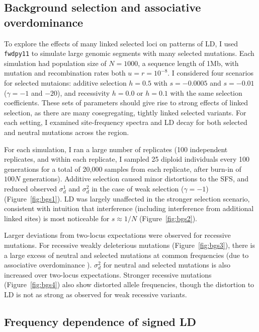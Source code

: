 \documentclass[]{article}
\begin{document}
\subsection{Background selection and associative overdominance}\label{sec:bgs}

To explore the effects of many linked selected loci on patterns of LD, I used
\texttt{fwdpy11} \citep{Thornton2014-pn,Thornton2019-qc} to simulate large
genomic segments with many selected mutations. Each simulation had population
size of \(N=1000\), a sequence length of 1Mb, with mutation and recombination
rates both \(u=r=10^{-8}\). I considered four scenarios for selected mutaions:
additive selection \(h=0.5\) with \(s=-0.0005\) and \(s=-0.01\) (\(\gamma=-1\)
and \(-20\)), and recessivity \(h=0.0\) or \(h=0.1\) with the same selection
coefficients. These sets of parameters should give rise to strong effects of
linked selection, as there are many cosegregating, tightly linked selected
variants. For each setting, I examined site-frequency spectra and LD decay for
both selected and neutral mutations across the region.

For each simulation, I ran a large number of replicates (100 independent
replicates, and within each replicate, I sampled 25 diploid individuals every
100 generations for a total of 20,000 samples from each replicate, after
burn-in of \(100N\) generations). Additive selection caused minor distortions
to the SFS, and reduced observed \(\sigma_d^1\) and \(\sigma_d^2\) in the case
of weak selection (\(\gamma=-1\)) (Figure~\ref{fig:bgs1}). LD was largely
unaffected in the stronger selection scenario, consistent with intuition that
interference (including interference from additional linked sites) is most
noticeable for \(s\approx1/N\) (Figure~\ref{fig:bgs2}).

Larger deviations from two-locus expectations were observed for recessive
mutations. For recessive weakly deleterious mutations (Figure~\ref{fig:bgs3}),
there is a large excess of neutral and selected mutations at common frequencies
(due to associative overdominance \citep{Zhao2016-bb}). \(\sigma_d^2\) for
neutral and selected mutations is also increased over two-locus expectations.
Stronger recessive mutations (Figure~\ref{fig:bgs4}) also show distorted allele
frequencies, though the distortion to LD is not as strong as observed for weak
recessive variants.

\subsection{Frequency dependence of signed LD}
\end{document}
